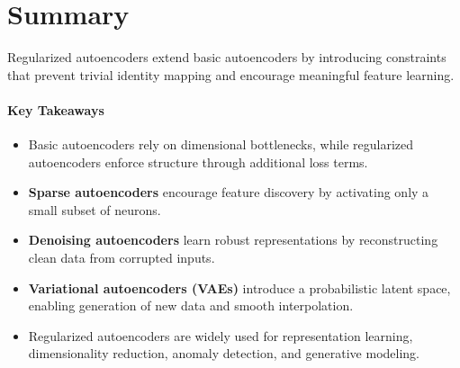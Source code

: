 \documentclass{article}
\begin{document}


\section{Summary}

Regularized autoencoders extend basic autoencoders by introducing constraints that prevent trivial identity mapping and encourage meaningful feature learning.

\paragraph{Key Takeaways}
\begin{itemize}
    \item Basic autoencoders rely on dimensional bottlenecks, while regularized autoencoders enforce structure through additional loss terms.
    \item \textbf{Sparse autoencoders} encourage feature discovery by activating only a small subset of neurons.
    \item \textbf{Denoising autoencoders} learn robust representations by reconstructing clean data from corrupted inputs.
    \item \textbf{Variational autoencoders (VAEs)} introduce a probabilistic latent space, enabling generation of new data and smooth interpolation.
    \item Regularized autoencoders are widely used for representation learning, dimensionality reduction, anomaly detection, and generative modeling.
\end{itemize}
\end{document}

